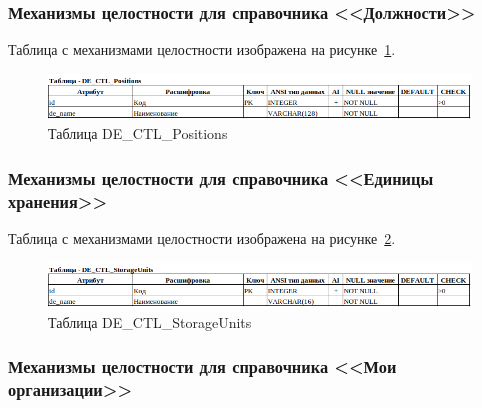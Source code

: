 \subsubsection{Механизмы целостности для справочника <<Должности>>}

Таблица с механизмами целостности изображена на рисунке~\ref{fig:Logic_DE_CTL_Positions}.

\begin{figure}[!h]
    \centering

    \includegraphics[width=18cm]
    {assets/database/Types/DE_CTL_Positions.png}

    \caption{Таблица DE\_CTL\_Positions}

    \label{fig:Logic_DE_CTL_Positions}
\end{figure}


\subsubsection{Механизмы целостности для справочника <<Единицы хранения>>}

Таблица с механизмами целостности изображена на рисунке~\ref{fig:Logic_DE_CTL_StorageUnits}.

\begin{figure}[!h]
    \centering

    \includegraphics[width=18cm]
    {assets/database/Types/DE_CTL_StorageUnits.png}

    \caption{Таблица DE\_CTL\_StorageUnits}

    \label{fig:Logic_DE_CTL_StorageUnits}
\end{figure}


\subsubsection{Механизмы целостности для справочника <<Мои организации>>}

